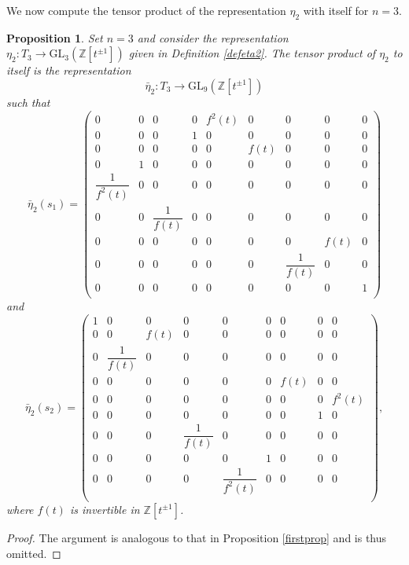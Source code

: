 \documentclass[reqno]{amsart}
\newtheorem{proposition}[theorem]{Proposition}
\begin{document}
We now compute the tensor product of the representation $\eta_2$ with itself for $n=3$.

\begin{proposition} \label{secondprop}
Set $n=3$ and consider the representation $\eta_2:T_3 \longrightarrow \mathrm{GL}_3(\mathbb{Z}[t^{\pm 1}])$ given in Definition \ref{defeta2}. The tensor product of $\eta_2$ to itself is the representation $$\bar{\eta}_2:T_3 \longrightarrow \mathrm{GL}_9(\mathbb{Z}[t^{\pm 1}])$$ such that
$$
\bar{\eta}_2(s_1)=
\left( \begin{matrix}
0 & 0 & 0 & 0 & f^2(t) & 0 & 0 & 0 & 0\\
0 & 0 & 0 & 1 & 0 & 0 & 0 & 0 & 0\\
0 & 0 & 0 & 0 & 0 & f(t) & 0 & 0 & 0\\
0 & 1 & 0 & 0 & 0 & 0 & 0 & 0 & 0\\
\dfrac{1}{f^2(t)} & 0 & 0 & 0 & 0 & 0 & 0 & 0 & 0\\
0 & 0 & \dfrac{1}{f(t)} & 0 & 0 & 0 & 0 & 0 & 0\\
0 & 0 & 0 & 0 & 0 & 0 & 0 & f(t) & 0\\
0 & 0 & 0 & 0 & 0 & 0 & \dfrac{1}{f(t)} & 0 & 0\\
0 & 0 & 0 & 0 & 0 & 0 & 0 & 0 & 1\\
\end{matrix}\right)
$$
and 
$$
\bar{\eta}_2(s_2)=
\left( \begin{matrix}
1 & 0 & 0 & 0 & 0 & 0 & 0 & 0 & 0\\
0 & 0 & f(t) & 0 & 0 & 0 & 0 & 0 & 0\\
0 & \dfrac{1}{f(t)} & 0 & 0 & 0 & 0 & 0 & 0 & 0\\
0 & 0 & 0 & 0 & 0 & 0 & f(t) & 0 & 0\\
0 & 0 & 0 & 0 & 0 & 0 & 0 & 0 & f^2(t)\\
0 & 0 & 0 & 0 & 0 & 0 & 0 & 1 & 0\\
0 & 0 & 0 & \dfrac{1}{f(t)} & 0 & 0 & 0 & 0 & 0\\
0 & 0 & 0 & 0 & 0 & 1 & 0 & 0 & 0\\
0 & 0 & 0 & 0 & \dfrac{1}{f^2(t)} & 0 & 0 & 0 & 0\\
\end{matrix}\right),
$$
where $f(t)$ is invertible in $ \mathbb{Z}[t^{\pm 1}]$.
\end{proposition}

\begin{proof}
The argument is analogous to that in Proposition \ref{firstprop} and is thus omitted.
\end{proof}
\end{document}

